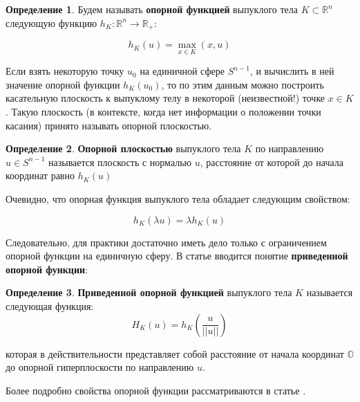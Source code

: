 \documentclass[a4paper, 12pt, titlepage]{article}
\theoremstyle{definition}
\newtheorem{SmartDefinition}{Определение}
\theoremstyle{plain}
\begin{document}
\begin{SmartDefinition}
 \label{def:support-function}
 Будем называть \textbf{опорной функцией} выпуклого тела
 $K \subset \mathbb{R}^{n}$ следующую функцию
 $h_{K}: \mathbb{R}^{n} \to \mathbb{R}_{+}$:

 \begin{equation}h_{K}(u) = \max \limits_{x \in K}(x, u)\end{equation}
\end{SmartDefinition}

Если взять некоторую точку $u_{0}$ на единичной сфере $S^{n - 1}$, и вычислить
в ней значение опорной функции $h_{K}(u_{0})$, то по этим данным можно
построить касательную плоскость к выпуклому телу в некоторой (неизвестной!)
точке $x \in K$. Такую плоскость (в контексте, когда нет информации о положении
точки касания) принято называть опорной плоскостью.

\begin{SmartDefinition}
 \label{def:support-plane}
 \textbf{Опорной плоскостью} выпуклого тела $K$ по
 направлению $u \in S^{n - 1}$ называется плоскость с нормалью $u$, расстояние
 от которой до начала координат равно $h_{K}(u)$
\end{SmartDefinition}

Очевидно, что опорная функция выпуклого тела обладает следующим свойством:

\begin{equation}
 h_{K}(\lambda u) = \lambda h_{K}(u)
\end{equation}

Следовательно, для практики достаточно иметь дело только с ограничением опорной
функции на единичную сферу. В статье \cite{journals/jmiv/KarlKVW96} вводится
понятие \textbf{приведенной опорной функции}:

\begin{SmartDefinition}
 \label{def:support-plane}
 \textbf{Приведенной опорной функцией} выпуклого тела $K$ называется следующая
функция:
 \begin{equation}H_{K} (u) = h_{K} (\frac{u}{||u||})\end{equation}
\end{SmartDefinition}

которая в действительности представляет собой расстояние от начала координат
$\mathbb{O}$ до опорной гиперплоскости по направлению $u$.

Более подробно свойства опорной функции рассматриваются в статье
\cite{journals/cviu/GhoshK98}.
\end{document}
